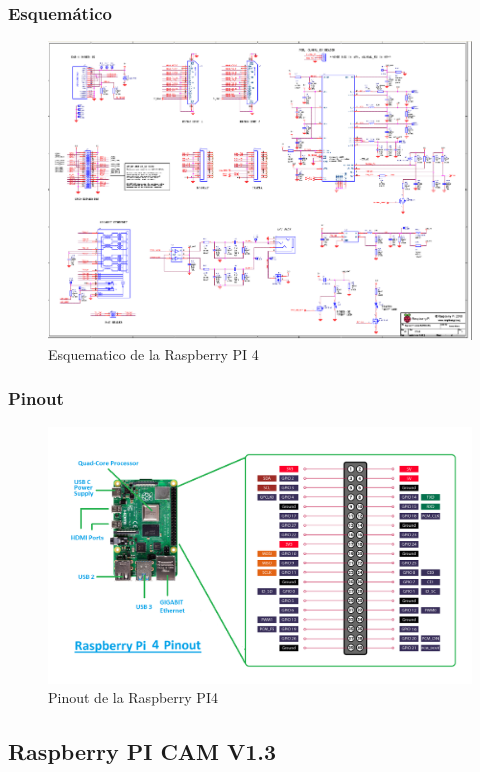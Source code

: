 \documentclass[12pt,a4paper]{article}
\begin{document}
\subsubsection{Esquemático}
\begin{figure}[H]
    \centering
\includegraphics[width=0.9\linewidth]{Carpeta tecnica/Esquematico Raspberry.png}
\caption{Esquematico de la Raspberry PI 4}
\end{figure}

\subsubsection{Pinout}
\begin{figure}[H]
    \centering
\includegraphics[width=\linewidth]{Carpeta tecnica/Pinout4.png}
\caption{Pinout de la Raspberry PI4}
\end{figure}

\subsection{Raspberry PI CAM V1.3}
\end{document}
